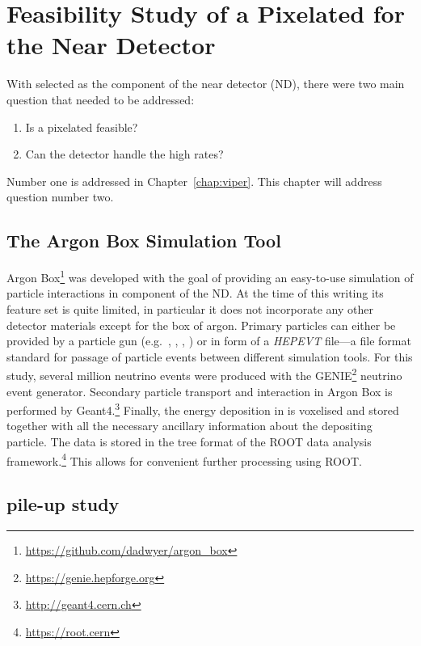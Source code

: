 \chapter{Feasibility Study of a Pixelated \lartpc{} for the \dune{} Near Detector}
\label{chap:dune-nd}


With \AC{} selected as  the \lar{} component of the \dune{} near detector (ND), there were two main question that needed to be addressed:
\begin{enumerate}
	\item Is a pixelated \lartpc{} feasible?
	\item Can the \lar{} detector handle the high rates?
\end{enumerate}
Number one is addressed in Chapter~\ref{chap:viper}.
This chapter will address question number two.


\section{The Argon Box Simulation Tool}
\label{sec:dune-nd_argon-box}

Argon Box\footnote{\url{https://github.com/dadwyer/argon_box}} was developed with the goal of providing an easy-to-use simulation of particle interactions in \lar{} component of the ND.
At the time of this writing its feature set is quite limited, in particular it does not incorporate any other detector materials except for the box of argon.
Primary particles can either be provided by a particle gun (e.g.\ \Pem, \Pn, \Pp, \Pgmp) or in form of a \emph{HEPEVT} file---a file format standard for passage of particle events between different simulation tools.
For this study, several million neutrino events were produced with the GENIE\footnote{\url{https://genie.hepforge.org}} neutrino event generator.
Secondary particle transport and interaction in Argon Box is performed by Geant4.\footnote{\url{http://geant4.cern.ch}}
Finally, the energy deposition in \lar{} is voxelised and stored together with all the necessary ancillary information about the depositing particle.
The data is stored in the tree format of the ROOT data analysis framework.\footnote{\url{https://root.cern}}
This allows for convenient further processing using ROOT.


\section{\Pgpz pile-up study}
\label{sec:dune-nd_pile-up}

